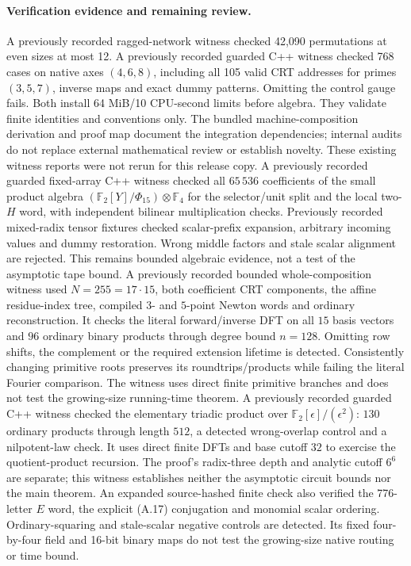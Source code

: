 \documentclass[11pt]{article}
\newcommand{\F}{\mathbb F}
\begin{document}
\paragraph{Verification evidence and remaining review.}
A previously recorded ragged-network witness checked 42,090 permutations at even
sizes at most 12. A previously recorded guarded C++ witness checked 768 cases on
native axes $(4,6,8)$, including all 105 valid CRT addresses for primes
$(3,5,7)$, inverse maps and exact dummy patterns. Omitting the control
gauge fails. Both install 64 MiB/10 CPU-second limits before algebra.
They validate finite identities and conventions only. The bundled
machine-composition derivation and proof map document the integration
dependencies; internal audits do not replace external mathematical review
or establish novelty. These existing witness reports were not rerun for
this release copy.
A previously recorded guarded fixed-array C++ witness checked all $65\,536$
coefficients of the small product algebra
$(\F_2[Y]/\Phi_{15})\otimes\F_4$ for the selector/unit split and
the local two-$H$ word, with independent bilinear multiplication checks.
Previously recorded mixed-radix tensor fixtures checked scalar-prefix expansion,
arbitrary incoming values and dummy restoration. Wrong middle factors
and stale scalar alignment are rejected. This remains bounded algebraic
evidence, not a test of the asymptotic tape bound.
A previously recorded bounded whole-composition witness used $N=255=17\cdot15$,
both coefficient CRT components, the affine residue-index tree,
compiled $3$- and $5$-point Newton words and ordinary reconstruction.
It checks the literal forward/inverse DFT on all $15$ basis vectors
and $96$ ordinary binary products through degree bound $n=128$.
Omitting row shifts, the complement or the required extension lifetime
is detected. Consistently changing primitive roots preserves its
roundtrips/products while failing the literal Fourier comparison.
The witness uses direct finite primitive branches and does not test
the growing-size running-time theorem.
A previously recorded guarded C++ witness checked the elementary triadic product
over $\F_2[\epsilon]/(\epsilon^2)$: $130$ ordinary products through
length $512$, a detected wrong-overlap control and a nilpotent-law
check. It uses direct finite DFTs and base cutoff $32$ to exercise
the quotient-product recursion. The proof's radix-three depth and
analytic cutoff $6^6$ are separate; this witness establishes neither
the asymptotic circuit bounds nor the main theorem.
An expanded source-hashed finite check also verified the 776-letter
$E$ word, the explicit (A.17) conjugation and monomial scalar ordering.
Ordinary-squaring and stale-scalar negative controls are detected.
Its fixed four-by-four field and 16-bit binary maps do not test the
growing-size native routing or time bound.
\end{document}
